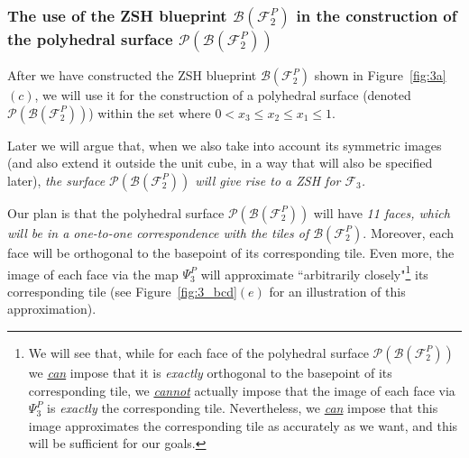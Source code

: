 \documentclass[12pt,letterpaper]{article}
\renewcommand{\P}{\mathcal{P}}
\newcommand{\B}{\mathcal{B}}
\newcommand{\F}{\mathcal{F}}
\begin{document}
\subsubsection{The use of the ZSH blueprint $\B(\F_2^P)$ in the construction of the polyhedral surface $\P(\B(\mathcal{F}_2^P))$}

After we have constructed the ZSH blueprint $\B(\F_2^P)$ shown in Figure~\ref{fig:3a}$(c)$, we will use it for the construction of a polyhedral surface (denoted $\P(\B(\mathcal{F}_2^P))$) within the set where $0 < x_3 \le x_2 \le x_1 \le 1$. 

Later we will argue that, when we also take into account its symmetric images (and also extend it outside the unit cube, in a way that will also be specified later), {\em  the surface $\P(\B(\mathcal{F}_2^P))$ will give rise to a ZSH for $\mathcal{F}_3$.}






%
%
%
%
%






Our plan is that the polyhedral surface $\P(\B(\mathcal{F}_2^P))$ will have {\em 11 faces, which will be in a one-to-one correspondence with the  tiles of $\B(\F_2^P)$}. Moreover, each face will be orthogonal to the basepoint of its corresponding tile. Even more, the image of each face via the map $\Psi_3^P$ will  approximate ``arbitrarily closely"\footnote{We will see that, while for each face of the polyhedral surface $\P(\B(\mathcal{F}_2^P))$ we \underline{\em can} impose  that it is  {\em exactly} orthogonal to the basepoint of its corresponding tile, we \underline{\em cannot} actually impose that the image of each face via  $\Psi_3^P$ is {\em exactly} the corresponding tile. Nevertheless, we \underline{\em can} impose that this image approximates the corresponding tile as accurately as we want, and this will be sufficient for our goals.}  its corresponding tile (see Figure~\ref{fig:3_bcd}$(e)$ for an illustration of this approximation). 
\end{document}
